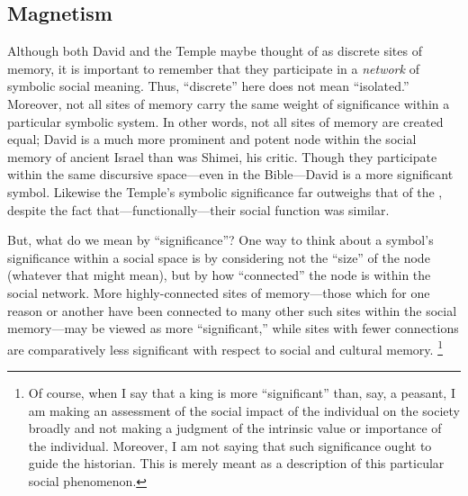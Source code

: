 \subsection{Magnetism}
Although both David and the Temple maybe thought of as discrete sites of memory, it is important to remember that they participate in a \emph{network} of symbolic social meaning. Thus, ``discrete'' here does not mean ``isolated.'' Moreover, not all sites of memory carry the same weight of significance within a particular symbolic system. In other words, not all sites of memory are created equal; David is a much more prominent and potent node within the social memory of ancient Israel than was Shimei, his critic. Though they participate within the same discursive space---even in the Bible---David is a more significant symbol. Likewise the Temple's symbolic significance far outweighs that of the , despite the fact that---functionally---their social function was similar.

But, what do we mean by ``significance''? One way to think about a symbol's significance within a social space is by considering not the ``size'' of the node (whatever that might mean), but by how ``connected'' the node is within the social network. More highly-connected sites of memory---those which for one reason or another have been connected to many other such sites within the social memory---may be viewed as more ``significant,'' while sites with fewer connections are comparatively less significant with respect to social and cultural memory.%
    \footnote{Of course, when I say that a king is more ``significant'' than, say, a peasant, I am making an assessment of the social impact of the individual on the society broadly and not making a judgment of the intrinsic value or importance of the individual. Moreover, I am not saying that such significance ought to guide the historian. This is merely meant as a description of this particular social phenomenon.}


